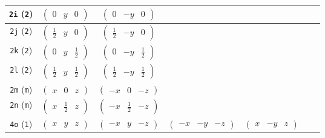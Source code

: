 \documentclass[fleqn,9pt,landscape]{jsarticle}
\begin{document}
\begin{center}
\begin{longtable}{ccccccc}
{\tt 2i} ({\tt 2}) & $ \begin{pmatrix} 0 & y & 0 \end{pmatrix} $ & $ \begin{pmatrix} 0 & - y & 0 \end{pmatrix} $ & $  $ & $  $ \\ \hline
{\tt 2j} ({\tt 2}) & $ \begin{pmatrix} \frac{1}{2} & y & 0 \end{pmatrix} $ & $ \begin{pmatrix} \frac{1}{2} & - y & 0 \end{pmatrix} $ & $  $ & $  $ \\ \hline
{\tt 2k} ({\tt 2}) & $ \begin{pmatrix} 0 & y & \frac{1}{2} \end{pmatrix} $ & $ \begin{pmatrix} 0 & - y & \frac{1}{2} \end{pmatrix} $ & $  $ & $  $ \\ \hline
{\tt 2l} ({\tt 2}) & $ \begin{pmatrix} \frac{1}{2} & y & \frac{1}{2} \end{pmatrix} $ & $ \begin{pmatrix} \frac{1}{2} & - y & \frac{1}{2} \end{pmatrix} $ & $  $ & $  $ \\ \hline
{\tt 2m} ({\tt m}) & $ \begin{pmatrix} x & 0 & z \end{pmatrix} $ & $ \begin{pmatrix} - x & 0 & - z \end{pmatrix} $ & $  $ & $  $ \\ \hline
{\tt 2n} ({\tt m}) & $ \begin{pmatrix} x & \frac{1}{2} & z \end{pmatrix} $ & $ \begin{pmatrix} - x & \frac{1}{2} & - z \end{pmatrix} $ & $  $ & $  $ \\ \hline
{\tt 4o} ({\tt 1}) & $ \begin{pmatrix} x & y & z \end{pmatrix} $ & $ \begin{pmatrix} - x & y & - z \end{pmatrix} $ & $ \begin{pmatrix} - x & - y & - z \end{pmatrix} $ & $ \begin{pmatrix} x & - y & z \end{pmatrix} $ \\
\end{longtable}
\end{center}
\end{document}
